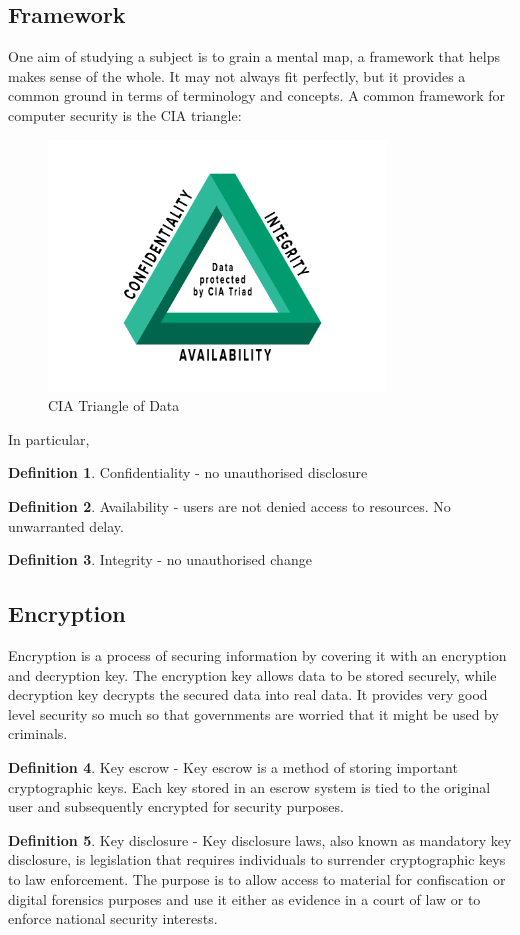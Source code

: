 \documentclass[a4paper]{article}
\theoremstyle{plain}
\theoremstyle{definition}
\newtheorem{defn}{Definition}[section]
\theoremstyle{remark}
\begin{document}
\subsection{Framework}
One aim of studying a subject is to grain a mental map, a framework that helps makes sense of the whole. It may not always fit perfectly, but it provides a common ground in terms of terminology and concepts. A common framework for computer security is the CIA triangle:
\begin{figure}[H]
	\centering
	\includegraphics[width=0.8\textwidth]{images/cia_triad.png}
	\caption{CIA Triangle of Data}
	\label{fig:images-cia_triad-png}
\end{figure}
In particular,
\begin{defn}
	Confidentiality - no unauthorised disclosure
\end{defn}
\begin{defn}
	Availability - users are not denied access to resources. No unwarranted delay.
\end{defn}
\begin{defn}
	Integrity - no unauthorised change
\end{defn}
\subsection{Encryption}
Encryption is a process of securing information by covering it with an encryption and decryption key. The encryption key allows data to be stored securely, while decryption key decrypts the secured data into real data. It provides very good level security so much so that governments are worried that it might be used by criminals.
\begin{defn}
	Key escrow - Key escrow is a method of storing important cryptographic keys. Each key stored in an escrow system is tied to the original user and subsequently encrypted for security purposes.
\end{defn}
\begin{defn}
	Key disclosure - Key disclosure laws, also known as mandatory key disclosure, is legislation that requires individuals to surrender cryptographic keys to law enforcement. The purpose is to allow access to material for confiscation or digital forensics purposes and use it either as evidence in a court of law or to enforce national security interests.
\end{defn}
\end{document}
